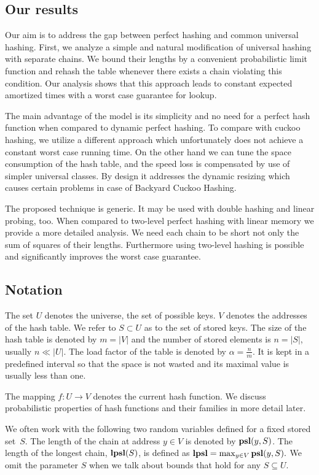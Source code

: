 \subsection{Our results}
Our aim is to address the gap between perfect hashing and common universal hashing.
First, we analyze a simple and natural modification of universal hashing with separate chains.
We bound their lengths by a convenient probabilistic limit function and rehash the table whenever there exists a chain violating this condition.
Our analysis shows that this approach leads to constant expected amortized times with a worst case guarantee for lookup.

The main advantage of the model is its simplicity and no need for a perfect hash function when compared to dynamic perfect hashing.
To compare with cuckoo hashing, we utilize a different approach which unfortunately does not achieve a constant worst case running time.
On the other hand we can tune the space consumption of the hash table, and the speed loss is compensated by use of simpler universal classes.
By design it addresses the dynamic resizing which causes certain problems in case of Backyard Cuckoo Hashing.

The proposed technique is generic. It may be used with double hashing and linear probing, too. 
When compared to two-level perfect hashing with linear memory we provide a more detailed analysis. 
We need each chain to be short not only the sum of squares of their lengths.
Furthermore using two-level hashing is possible and significantly improves the worst case guarantee.

\subsection{Notation}
The set $U$ denotes the universe, the set of possible keys. $V$ denotes the addresses of the hash table. We refer to $S \subset U$ as to the set of stored keys. The size of the hash table is denoted by $m = |V|$ and the number of stored elements is $n = |S|$, usually $n \ll |U|$. The load factor of the table is denoted by $\alpha = \frac{n}{m}$. It is kept in a predefined interval so that the space is not wasted and its maximal value is usually less than one.

The mapping $f\colon U \rightarrow V$ denotes the current hash function. We discuss probabilistic properties of hash functions and their families in more detail later.

We often work with the following two random variables defined for a fixed stored set~$S$. The length of the chain at address $y \in V$ is denoted by $\mathbf{psl}(y, S)$. The length of the longest chain, $\mathbf{lpsl}(S)$, is defined as $\mathbf{lpsl} = \max_{y \in V} \mathbf{psl}(y, S).$ We omit the parameter $S$ when we talk about bounds that hold for any $S \subseteq U$.

